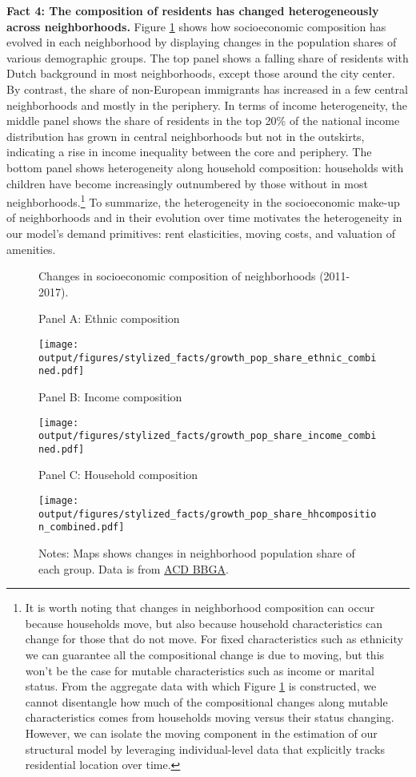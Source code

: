 \documentclass[11pt]{article}
\newcommand{\Paragraph}{\vspace{0.1cm}\noindent\textbf}
\begin{document}
\Paragraph{Fact 4: The composition of residents has changed heterogeneously across neighborhoods.} Figure \ref{fig:spatial evolution population} shows how socioeconomic composition has evolved in each neighborhood by displaying changes in the population shares of various demographic groups. The top panel shows a falling share of residents with Dutch background in most neighborhoods, except those around the city center. By contrast, the share of non-European immigrants has increased in a few central neighborhoods and mostly in the periphery. In terms of income heterogeneity, the middle panel shows the share of residents in the top 20\% of the national income distribution has grown in central neighborhoods but not in the outskirts, indicating a rise in income inequality between the core and periphery. The bottom panel shows heterogeneity along household composition: households with children have become increasingly outnumbered by those without in most neighborhoods.\footnote{It is worth noting that changes in neighborhood composition can occur because households move, but also because household characteristics can change for those that do not move. For fixed characteristics such as ethnicity we can guarantee all the compositional change is due to moving, but this won't be the case for mutable characteristics such as income or marital status. From the aggregate data with which Figure \ref{fig:spatial evolution population} is constructed, we cannot disentangle how much of the compositional changes along mutable characteristics comes from households moving versus their status changing. However, we can isolate the moving component in the estimation of our structural model by leveraging individual-level data that explicitly tracks residential location over time.} To summarize, the heterogeneity in the socioeconomic make-up of neighborhoods and in their evolution over time motivates the heterogeneity in our model's demand primitives: rent elasticities, moving costs, and valuation of amenities.

\begin{figure}[ht]
    \caption{Changes in socioeconomic composition of neighborhoods (2011-2017).}\label{fig:spatial evolution population}
    \caption*{{Panel A: Ethnic composition}}
    \centering
    \texttt{[image: output/figures/stylized\_facts/growth\_pop\_share\_ethnic\_combined.pdf]}
    \vspace{0.1cm}
    \caption*{{Panel B: Income composition}}
    \centering
    \texttt{[image: output/figures/stylized\_facts/growth\_pop\_share\_income\_combined.pdf]}
    \vspace{0.1cm}
    \caption*{{Panel C: Household composition}}
    \centering
    \texttt{[image: output/figures/stylized\_facts/growth\_pop\_share\_hhcomposition\_combined.pdf]}
    \caption*{\footnotesize Notes: Maps shows changes in neighborhood population share of each group. Data is from \href{https://data.amsterdam.nl/datasets/rl6-35tFAw2Ljw/basisbestand-gebieden-amsterdam-bbga/}{ACD BBGA}.}
\end{figure}
\end{document}
